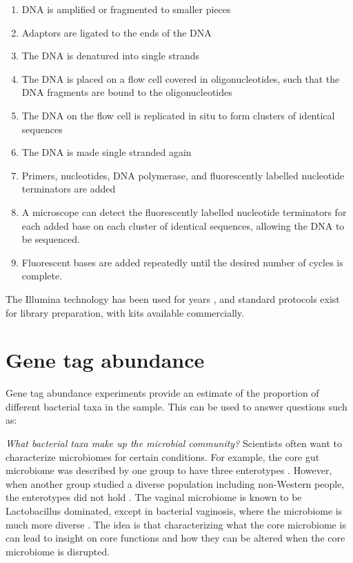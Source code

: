 \begin{enumerate}
\item DNA is amplified or fragmented to smaller pieces
\item Adaptors are ligated to the ends of the DNA
\item The DNA is denatured into single strands
\item The DNA is placed on a flow cell covered in oligonucleotides, such that the DNA fragments are bound to the oligonucleotides
\item The DNA on the flow cell is replicated in situ to form clusters of identical sequences
\item The DNA is made single stranded again
\item Primers, nucleotides, DNA polymerase, and fluorescently labelled nucleotide terminators are added
\item A microscope can detect the fluorescently labelled nucleotide terminators for each added base on each cluster of identical sequences, allowing the DNA to be sequenced.
\item Fluorescent bases are added repeatedly until the desired number of cycles is complete.
\end{enumerate}

The Illumina technology has been used for years \cite{bentley2008accurate}, and standard protocols exist for library preparation, with kits available commercially.

\section{Gene tag abundance}
Gene tag abundance experiments provide an estimate of the proportion of different bacterial taxa in the sample. This can be used to answer questions such as:

\textit{What bacterial taxa make up the microbial community?}
Scientists often want to characterize microbiomes for certain conditions. For example, the core gut microbiome was described by one group to have three enterotypes \cite{arumugam2011enterotypes}. However, when another group studied a diverse population including non-Western people, the enterotypes did not hold \cite{yatsunenko2012human}. The vaginal microbiome is known to be Lactobacillus dominated, except in bacterial vaginosis, where the microbiome is much more diverse \cite{hummelen2010deep}. The idea is that characterizing what the core microbiome is can lead to insight on core functions and how they can be altered when the core microbiome is disrupted.

